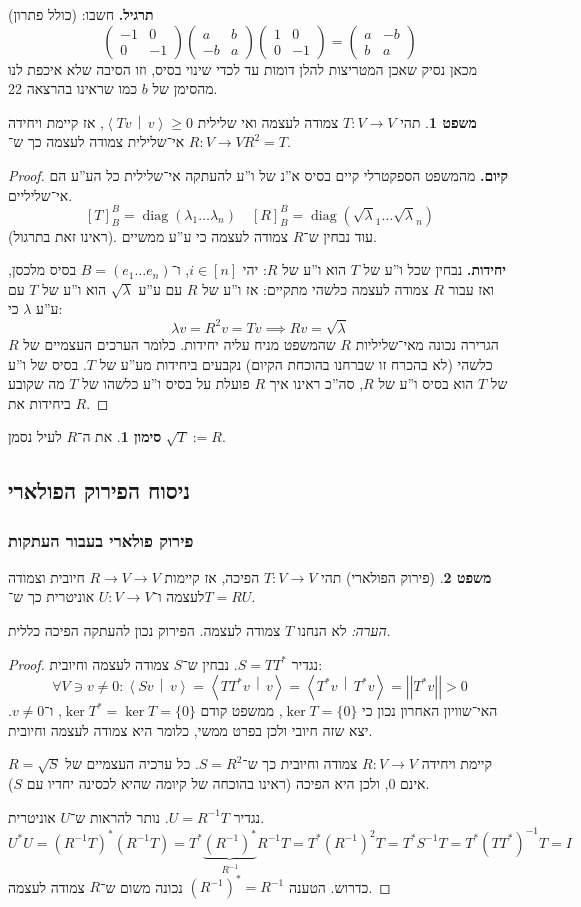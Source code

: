 \documentclass[a4paper]{article}
\newcommand\ra    {\rangle}
\newcommand\la    {\langle}
\DeclareMathOperator{\diag}    {diag}
\newcommand\co        {\colon}
\newcommand\pms[1]    {\begin{pmatrix}
		#1
\end{pmatrix}}
\newcommand\norm[1]   {\left \vert \left \vert #1 \right \vert \right \vert}
\newcommand\mut [2]   {\left \la #1 \,\middle\vert\, #2 \right \ra}
\renewcommand\lg      {\lambda}
\newcommand\op    {^{-1}}
\theoremstyle{definition}
\newtheorem{Theorem}{משפט}
\newtheorem{Notion}{סימון}
\newcommand\theo  [1] {\begin{Theorem}#1\end{Theorem}}
\newcommand\noti  [1] {\begin{Notion}#1\end{Notion}}
\begin{document}
	
	
	
	
	\textbf{תרגיל. }חשבו: (כולל פתרון)
	\[ \pms{-1 & 0 \\ 0 & -1}\pms{a & b \\ -b & a}\pms{1 & 0 \\ 0 & -1} = \pms{a & -b \\ b & a} \]
	מכאן נסיק שאכן המטריצות להלן דומות עד לכדי שינוי בסיס, וזו הסיבה שלא איכפת לנו מהסימן של $b$ כמו שראינו בהרצאה 22. 
	
	\theo{תהי $T \co V \to V$ צמודה לעצמה ואי שלילית $\mut{Tv}{v} \ge 0$, אז קיימת ויחידה $R \co V \to V$ אי־שלילית צמודה לעצמה כך ש־$R^2 = T$. }
	
	\begin{proof}
		\textbf{קיום. }
		מהמשפט הספקטרלי קיים בסיס א''נ של ו''ע להעתקה אי־שלילית כל הע''ע הם אי־שליליים. 
		\[ [T]^{B}_B = \diag(\lg_1 \dots \lg_n) \quad [R]_B^B = \diag(\sqrt \lg_1 \dots \sqrt \lg_n) \]
		(ראינו זאת בתרגול). עוד נבחין ש־$R$ צמודה לעצמה כי ע''ע ממשיים. 
		
		\textbf{יחידות. }נבחין שכל ו''ע של $T$ הוא ו''ע של $R$: יהי $i \in [n]$, ו־$B = (e_1 \dots e_n)$ בסיס מלכסן, ואז עבור $R$ צמודה לעצמה כלשהי מתקיים: אז ו''ע של $R$ עם ע''ע $\sqrt \lg$ הוא ו''ע של $T$ עם ע''ע $\lg$ כי: 
		\[ \lg v = R^2v = Tv \implies Rv = \sqrt \lg \]
		הגרירה נכונה מאי־שליליות $R$ שהמשפט מניח עליה יחידות. כלומר הערכים העצמיים של $R$ כלשהי (לא בהכרח זו שברחנו בהוכחת הקיום) נקבעים ביחידות מע''ע של $T$. בסיס של ו''ע של $T$ הוא בסיס ו''ע של $R$, סה''כ ראינו איך $R$ פועלת על בסיס ו''ע כלשהו של $T$ מה שקובע ביחידות את $R$. 
	\end{proof}
	
	\noti{את ה־$R$ לעיל נסמן $\sqrt{T} := R$. }
	
	\subsection{ניסוח הפירוק הפולארי}
	\subsubsection{פירוק פולארי בעבור העתקות}
	\theo{(פירוק הפולארי) תהי $T \co V \to V$ הפיכה, אז קיימות $R \to V \to V$ חיובית וצמודה לעצמה ו־$U \co V \to V$ אוניטרית כך ש־$T = RU$. }
	\textit{הערה: }לא הנחנו $T$ צמודה לעצמה. הפירוק נכון להעתקה הפיכה כללית. 
	\begin{proof}
		נגדיר $S = TT^*$. נבחין ש־$S$ צמודה לעצמה וחיובית: 
		\[ \forall V \ni v \neq 0 \co \mut{Sv}{v} = \mut{TT^* v}{v} = \mut{T^* v}{T^*v} = \norm{T^*v} > 0 \]
		האי־שוויון האחרון נכון כי $\ker T = \{0\}$, ממשפט קודם $\ker T^* = \ker T = \{0\}$, ו־$v \neq 0$. יצא שזה חיובי ולכן בפרט ממשי, כלומר היא צמודה לעצמה וחיובית. 
		
		קיימת ויחידה $R \co V \to V$ צמודה וחיובית כך ש־$S = R^2$. כל ערכיה העצמיים של $R = \sqrt S$ אינם $0$, ולכן היא הפיכה (ראינו בהוכחה של קיומה שהיא לכסינה יחדיו עם $S$). 
		
		נגדיר $U = R\op T$. נותר להראות ש־$U$ אוניטרית. 
		\[ U^*U = (R\op T)^*(R\op T) = T^*\underbrace{(R\op)^*}_{R\op}R\op T = T^*(R\op)^2 T = T^*S\op T = T^*(TT^*)\op T = I \]
		כדרוש. הטענה $(R\op)^* = R\op$ נכונה משום ש־$R$ צמודה לעצמה. 
	\end{proof}
	
\end{document}
